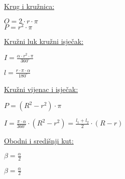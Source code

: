 \documentclass[9pt,oneside,a4paper]{report}
\begin{document}
\noindent
\begin{minipage}[t]{33mm}
	\noindent
	\underline{Krug i kru\v{z}nica:}

	\vspace{2mm}
	\noindent
\end{minipage}
\begin{minipage}[t]{40mm}
	\vspace*{15mm}
	$\displaystyle O=2\cdot r\cdot \pi$\\
	$\displaystyle P=r^2\cdot \pi$
\end{minipage}
\begin{minipage}[t]{45mm}
	\noindent
	\underline{Kru\v{z}ni luk kru\v{z}ni isje\v{c}ak:}

	\vspace{2mm}
	\noindent
\end{minipage}
\begin{minipage}[t]{40mm}
	\vspace*{10mm}
	$\displaystyle I=\frac{\alpha\cdot r^2\cdot \pi}{360^\circ}$

	\vspace{2mm}
	\noindent
	$\displaystyle l=\frac{r\cdot \pi\cdot \alpha}{180^\circ}$
\end{minipage}

\noindent
\begin{minipage}[t]{45mm}
	\noindent
	\underline{Kru\v{z}ni vijenac i isje\v{c}ak:}

	\vspace{2mm}
	\noindent
\end{minipage}
\begin{minipage}[t]{60mm}
	\vspace*{15mm}
	$\displaystyle P=(R^2-r^2)\cdot \pi$

	\vspace{2mm}
	$\displaystyle I=\frac{\pi\cdot \alpha}{360^\circ}\cdot (R^2-r^2)=\frac{l_1+l_2}2\cdot (R-r)$

\end{minipage}

\vspace{4mm}
\noindent
\underline{Obodni i sredi\v{s}nji kut:}

\vspace{2mm}
\noindent
\noindent
{}
\hspace{2mm}
\begin{minipage}[b]{30mm}
	$\displaystyle \beta=\frac{\alpha}2$
	\vspace*{15mm}
\end{minipage}
\begin{minipage}[b]{30mm}
	$\displaystyle \beta=\frac{\alpha}2$
	\vspace*{15mm}
\end{minipage}
\end{document}
